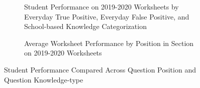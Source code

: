 \begin{figure}
     \centering
     \begin{subfigure}{0.49\textwidth}
        \caption{Student Performance on 2019-2020 \ts Worksheets by Everyday True Positive, Everyday False Positive, and School-based Knowledge Categorization}
        \label{fig:everyday_school}
    \end{subfigure}
    \begin{subfigure}{0.49\textwidth}
        \caption{Average Worksheet Performance by Position in Section on 2019-2020 \ts Worksheets}
        \label{fig:position_es}
    \end{subfigure}
    
    \caption{Student Performance Compared Across Question Position and Question Knowledge-type}
\end{figure}

